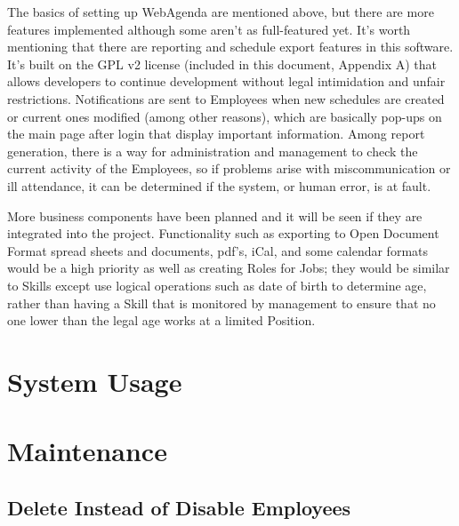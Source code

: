 \documentclass[a4paper,10pt]{report}
\begin{document}
\par \noindent \hspace*{1cm} The basics of setting up WebAgenda are mentioned above, but there are more features implemented although some aren't as full-featured yet. It's worth mentioning that there are reporting and schedule export features in this software. It's built on the GPL v2 license (included in this document, Appendix A) that allows developers to continue development without legal intimidation and unfair restrictions. Notifications are sent to Employees when new schedules are created or current ones modified (among other reasons), which are basically pop-ups on the main page after login that display important information. Among report generation, there is a way for administration and management to check the current activity of the Employees, so if problems arise with miscommunication or ill attendance, it can be determined if the system, or human error, is at fault.
\bigskip
\par \noindent \hspace*{1cm} More business components have been planned and it will be seen if they are integrated into the project. Functionality such as exporting to Open Document Format spread sheets and documents, pdf's, iCal, and some calendar formats would be a high priority as well as creating Roles for Jobs; they would be similar to Skills except use logical operations such as date of birth to determine age, rather than having a Skill that is monitored by management to ensure that no one lower than the legal age works at a limited Position.

\chapter{System Usage}

\chapter{Maintenance}

\section{Delete Instead of Disable Employees}
\end{document}
